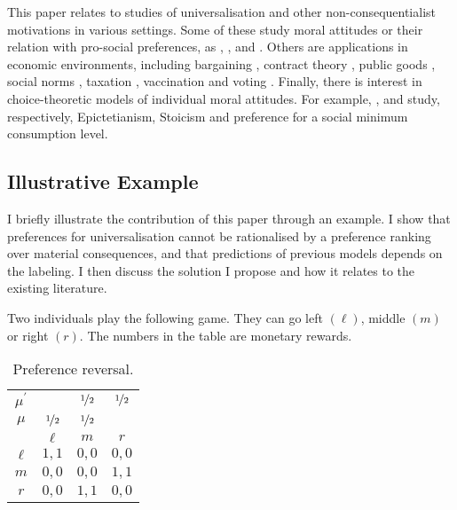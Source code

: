 This paper relates to studies of universalisation and other non-consequentialist motivations in various settings. Some of these study moral attitudes or their relation with pro-social preferences, as \cite{dewatripontMoralityMarkets2024}, \cite{ellingsenModelSocialDuties2024}, \cite{fleurbaeyAnalysisMoralMotives2024} and \cite{laslierUniversalizationAltruism2022}. Others are applications in economic environments, including bargaining \citep{dizarlarKantianEquilibriaClass2023,juan-bartroliMoralPreferencesBargaining2024}, contract theory \citep{sarkisianTeamIncentivesMoral2017,sarkisianOptimalIncentivesSchemes2021,sarkisianScreeningTeamsMoral2021}, public goods \citep{brekkeEconomicModelMoral2003a}, social norms \citep{juan-bartroliInjunctiveNormsTheory2024}, taxation \citep{RePEc:ces:ceswps:_9867}, vaccination \citep{dedonderGametheoreticAnalysisChildhood2023} and voting \citep{algerHomoMoralisGoes2022,dierksDoesUniversalizationEthics2024,grilloEthicalVotingHeterogenous2022}. Finally, there is interest in choice-theoretic models of individual moral attitudes. For example, \cite{ponthiereEpictetusianRationality2023}, \cite{ponthiereStoicismTragedyCommons2024} and \cite{shiEndogenousSocialMinimum2024} study, respectively, Epictetianism, Stoicism and preference for a social minimum consumption level.

\subsection{Illustrative Example}\label{sec:exampleuniv}

I briefly illustrate the contribution of this paper through an example. I show that preferences for universalisation cannot be rationalised by a preference ranking over material consequences, and that predictions of previous models depends on the labeling. I then discuss the solution I propose and how it relates to the existing literature.

Two individuals play the following game. They can go left \( ( \ell ) \), middle \( ( m ) \) or right \( ( r ) \). The numbers in the table are monetary rewards.

\begin{table}[H]
	\begin{center}
		\begin{tabular}{c | c c c}
			\(\mu^{\prime}\) &                     & \(\nicefrac{1}{2}\) & \(\nicefrac{1}{2}\) \\
			\(\mu\)          & \(\nicefrac{1}{2}\) & \(\nicefrac{1}{2}\) &                     \\
			                 & \(\ell\)            & \(m\)               & \(r\)               \\
			\hline
			\(\ell\)         & \(1,1\)             & \(0,0\)             & \(0,0\)             \\
			\(m\)            & \(0,0\)             & \(0,0\)             & \(1,1\)             \\
			\(r\)            & \(0,0\)             & \(1,1\)             & \(0,0\)
		\end{tabular}
	\end{center}
	\caption{Preference reversal.}
	\label{tab:reversal}
\end{table}

